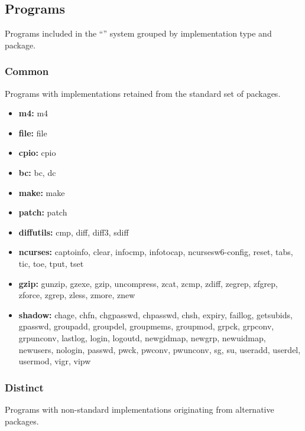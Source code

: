 \subsection{Programs}\label{Programs}

Programs included in the \enquote{} system grouped by implementation type and package.

\subsubsection{Common}

Programs with implementations retained from the standard set of packages.

\begin{itemize}
    \item \textbf{m4:} m4
    \item \textbf{file:} file
    \item \textbf{cpio:} cpio
    \item \textbf{bc:} bc, dc
    \item \textbf{make:} make
    \item \textbf{patch:} patch
    \item \textbf{diffutils:} cmp, diff, diff3, sdiff
    \item \textbf{ncurses:} captoinfo, clear, infocmp, infotocap, ncursesw6-config, reset, tabs, tic, toe, tput, tset
    \item \textbf{gzip:} gunzip, gzexe, gzip, uncompress, zcat, zcmp, zdiff, zegrep, zfgrep, zforce, zgrep, zless, zmore, znew
    \item \textbf{shadow:} chage, chfn, chgpasswd, chpasswd, chsh, expiry, faillog, getsubids, gpasswd, groupadd, groupdel, groupmems, groupmod, grpck, grpconv, grpunconv, lastlog, login, logoutd, newgidmap, newgrp, newuidmap, newusers, nologin, passwd, pwck, pwconv, pwunconv, sg, su, useradd, userdel, usermod, vigr, vipw
\end{itemize}

\subsubsection{Distinct}

Programs with non-standard implementations originating from alternative packages.

